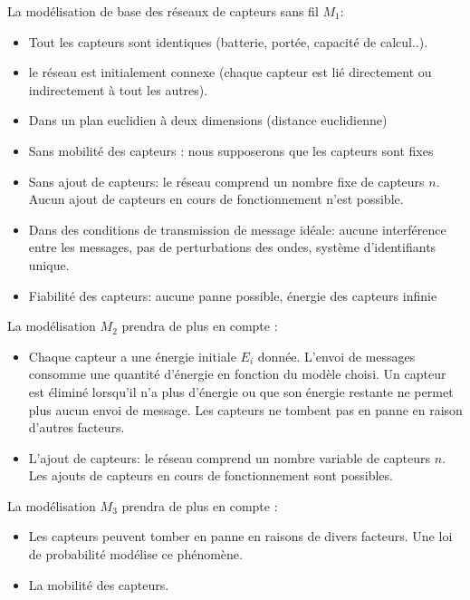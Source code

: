 La modélisation de base des réseaux de capteurs sans fil \textbf{$M_1$}:
\begin{itemize}
 \item Tout les capteurs sont identiques (batterie, portée, capacité de calcul..).
 \item le réseau est initialement connexe (chaque capteur est lié directement ou indirectement à tout les autres).
 \item Dans un plan euclidien à deux dimensions (distance euclidienne)
 \item Sans mobilité des capteurs : nous supposerons que les capteurs sont fixes
 \item Sans ajout de capteurs: le réseau comprend un nombre fixe de capteurs $n$. Aucun ajout de capteurs en cours de fonctionnement n'est possible.
 \item Dans des conditions de transmission de message idéale: aucune interférence entre les messages, pas de perturbations des ondes, système d'identifiants unique.
 \item Fiabilité des capteurs: aucune panne possible, énergie des capteurs infinie \\
\end{itemize}

  La modélisation \textbf{$M_2$} prendra de plus en compte :
  
\begin{itemize}
 \item Chaque capteur a une énergie initiale $E_i$ donnée. L'envoi de messages consomme une quantité d'énergie en fonction du modèle choisi. Un capteur est éliminé lorsqu'il n'a plus d'énergie ou que son énergie restante ne permet plus aucun envoi de message. Les capteurs ne tombent pas en panne en raison d'autres facteurs.   
 \item L'ajout de capteurs: le réseau comprend un nombre variable de capteurs $n$. Les ajouts de capteurs en cours de fonctionnement sont possibles.\\
 
\end{itemize}

La modélisation \textbf{$M_3$} prendra de plus en compte :

\begin{itemize}
 \item Les capteurs peuvent tomber en panne en raisons de divers facteurs. Une loi de probabilité modélise ce phénomène.   
 \item La mobilité des capteurs.\\
 
\end{itemize}



